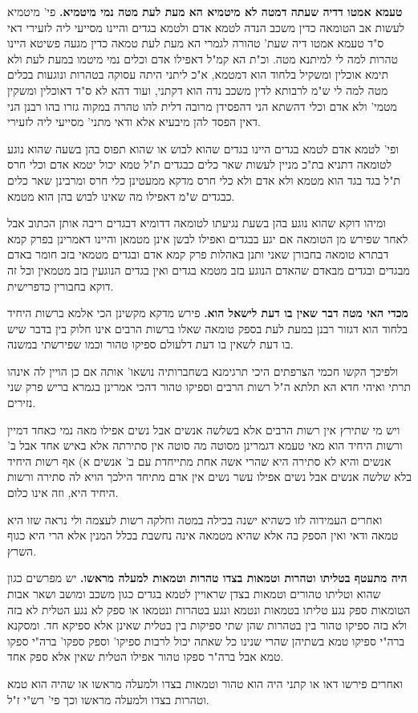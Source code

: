 \documentclass[12pt, openany]{book}
\newcommand{\sethebfont}{
\fontsize{10.5pt}{21.0pt} \selectfont
}
\newcommand{\twocol}[1]{
	{\sethebfont \begin{multicols}{2}
			#1
	\end{multicols}}	
}
\begin{document}
\twocol{\textbf{טעמא אמטו דדיה שעתה דמטה לא מיטמיא הא מעת לעת מטה נמי מיטמיא.}  פי' מיטמיא לעשות אב הטומאה כדין משכב הנדה לטמא אדם ולטמא בגדים והיינו מסייעי ליה לזעירי דאי ס"ד טעמא אמטו דיה שעת' טהורה לגמרי הא מעת לעת טמאה כדין מגעה פשיטא היינו טהרות למה לי למיתנא מטה. וכ"ת הא קמ"ל דאפילו אדם וכלים נמי מיטמו במעת לעת ולא תימא אוכלין ומשקיל בלחוד הוא דמטמא, א"כ ליתני היתה עסוקה בטהרות ונוגעות בכלים מטה למה לי ש"מ לרבותא לדין משכב נדה הוא דקתני, ועוד דהא לא ס"ד דאוכלין ומשקין מטמי' ולא אדם וכלי דהשתא הני דהפסידן מרובה דלית להו טהרה במקוה גזרו בהו רבנן הני דאין הפסד להן מיבעיא אלא ודאי מתני' מסייעי ליה לזעירי.\par ופי' לטמא אדם לטמא בגדים היינו בגדים שהוא לבוש או שהוא תפוס בהן בשעה שהוא נוגע לטומאה דתניא בת"כ מניין לעשות שאר כלים כבגדים ת"ל טמא יכול יטמא אדם וכלי חרס ת"ל בגד בגד הוא מטמא ולא אדם ולא כלי חרס מדקא ממעטינן כלי חרס ומרבינן שאר כלים כבגדים ש"מ דאפילו מה שאינו לבוש בהן הוא מטמא.\par  ומיהו דוקא שהוא נוגע בהן בשעת נגיעתו לטומאה דדומיא דבגדים ריבה אותן הכתוב אבל לאחר שפירש מן הטומאה אם יגע בבגדים ואפילו לבשן אינן מטמאן והיינו דאמרינן בפרק קמא דבתרא טומאה בחבורן שאני ותנן באהלות פרק קמא אדם ובגדים מטמאי בזב חומר באדם מבגדים ובגדים מבאדם שהאדם הנוגע בזב מטמא בגדים ואין בגדים הנוגעין בזב מטמאין וכל זה דוקא בחבורין כדפרישית. 
\par\textbf{מכדי האי מטה דבר שאין בו דעת לישאל הוא.}  פירש מדקא מקשינן הכי אלמא ברשות היחיד בלחוד הוא דגזור רבנן במעת לעת בספק טומאה שאלו ברשות הרבים אינו חלוק בין בדבר שיש בו דעת לשאין בו דעת דלעולם ספיקו טהור וכמו שפירשתי במשנה.\par  ולפיכך הקשו חכמי הצרפתים היכי תרגימנא בשחברותיה נושאו' אותה אם כן הויין לה אינהו תרתי ואיהי חדא הא תלתא ה"ל רשות הרבים וספיקו טהור דהכי אמרינן בגמרא בריש פרק שני נזירים.\par  ויש מי שתירץ אין רשות הרבים אלא בשלשה אנשים אבל נשים אפילו מאה נמי כאחד דמיין ורשות היחיד הוא מאי טעמא דגמרינן מסוטה מה סוטה אין סתירתה אלא באיש אחד אבל ב' אנשים והיא לא סתירה היא שהרי אשה אחת מתייחדת עם ב' אנשים א) אף רשות היחיד בלא שלשה אנשים אבל נשים אפילו עשר נשים אין אדם מתיחד הילכך הויא לה סתירה ורשות היחיד היא, וזה אינו כלום.\par  ואחרים העמידוה לזו כשהיא ישנה בכילה במטה וחלקה רשות לעצמה ולי נראה שזו היא טמאה ודאי ואין הספק בה אלא שהיא מטמאה אינה נחשבת בכלל המנין אלא הרי היא כגוף השרץ. 
\par\textbf{היה מתעטף בטליתו וטהרות וטמאות בצדו טהרות וטמאות למעלה מראשו.}  יש מפרשים כגון שהוא וטליתו טהורים וטמאות בצדן שראויין לטמא בגדים כגון משכב ומושב ושאר אבות הטומאות ספק נגע טליתו בטמאות ונטמא ונגע בטהרות ונטמאו או ספק לא נגע הטלית לא בזה ולא בזה ספיקו טהור בין בטהרות שהן שתי ספיקות בין בטלית שאינן אלא ספיקא חד. ומסקנא ברה"י ספיקו טמא בשתיהן שהרי שנינו כל שאתה יכול לרבות ספיקו' וספק ספקו' ברה"י ספקו טמא אבל ברה"ר ספקו טהור אפילו הטלית שאין אלא ספק אחד.\par  ואחרים פירשו דאו או קתני היה הוא טהור וטמאות בצדו ולמעלה מראשו או שהיה הוא טמא וטהרות בצדו ולמעלה מראשו וכך פי' רש"י ז"ל. 
}
\end{document}
